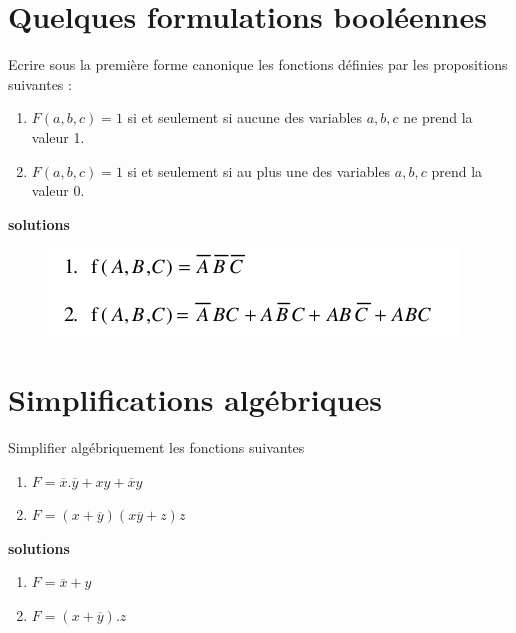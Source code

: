 \documentclass[a4paper,11pt]{article}
\begin{document}
\newpage

\section{Quelques formulations booléennes}

Ecrire sous la première forme canonique les fonctions définies par les propositions suivantes :

\begin{enumerate}
\item $F(a,b,c)=1$ si et seulement si aucune des variables $a,b,c$ ne prend la valeur 1.
\item $F(a,b,c)=1$ si et seulement si au plus une des variables $a,b,c$ prend la valeur 0.
\end{enumerate}

  {\bf solutions}
  \begin{figure}[h]
  \begin{center}
  \includegraphics[scale=0.5]{./te1-douillar-3.png}
  \end{center}
  \end{figure}

\section{Simplifications algébriques}
Simplifier algébriquement les  fonctions suivantes

\begin{enumerate}
\item $F=\overline{x}.\overline{y} + xy+\overline{x}y$
\item $F=(x+\overline{y})(x\overline{y}+z)z$
\end{enumerate}

\begin{cadre}
  {\bf solutions}
  \begin{enumerate}
  \item $F=\overline{x} + y$
  \item $F=(x+\overline{y}).z$
  \end{enumerate}
\end{cadre}
\end{document}
